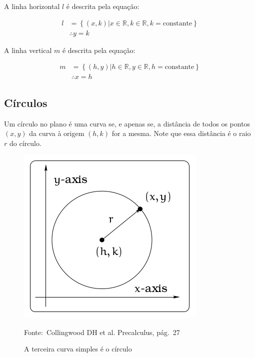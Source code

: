 \documentclass[pdftex, brazil, 12pt, twoside]{article}
\begin{document}
A linha horizontal $l$ é descrita pela equação:

\begin{equation}
  \begin{split}
               l & = \left\{(x, k) | x \in \mathbb{R}, k \in \mathbb{R}, k = \text{constante}\right\}\\
                 & \therefore y = k
  \end{split}
\end{equation}

A linha vertical $m$ é descrita pela equação:

\begin{equation}
  \begin{split}
               m & = \left\{(h, y) | h \in \mathbb{R}, y \in \mathbb{R}, h = \text{constante}\right\}\\
                 & \therefore x = h
  \end{split}
\end{equation}


\subsection{Círculos}
\label{tres-curvas-circulos}

Um círculo no plano é uma curva se, e apenas se, a distância de todos os pontos
$(x, y)$ da curva à origem $(h, k)$ for a mesma. Note que essa distância é o raio $r$
do círculo.

\begin{figure}[ht]
  \begin{center}
    \caption{A terceira curva simples é o círculo}
    \label{fig:curvas-circulo}
    \includegraphics[scale=0.7]{imagens/definicao-circulo.png}
    
    \footnotesize{Fonte:~Collingwood DH et al. Precalculus, pág.\ 27}
  \end{center}
\end{figure}
\end{document}
